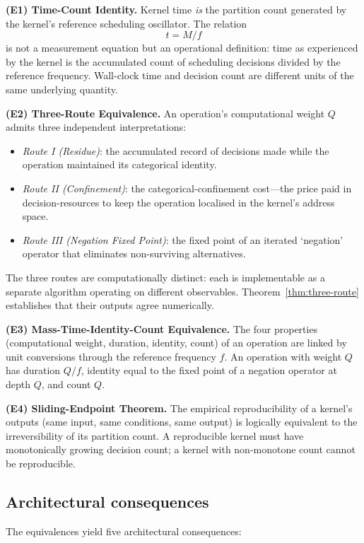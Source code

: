 \documentclass[twocolumn,11pt,a4paper]{article}
\newcommand{\Mcount}{M}
\newcommand{\Qweight}{Q}
\begin{document}
\textbf{(E1) Time-Count Identity.} Kernel time \emph{is} the partition count generated by the kernel's reference scheduling oscillator. The relation
\[
t = \Mcount / f
\]
is not a measurement equation but an operational definition: time as experienced by the kernel is the accumulated count of scheduling decisions divided by the reference frequency. Wall-clock time and decision count are different units of the same underlying quantity.

\textbf{(E2) Three-Route Equivalence.} An operation's computational weight $\Qweight$ admits three independent interpretations:
\begin{itemize}[nosep]
\item \emph{Route I (Residue)}: the accumulated record of decisions made while the operation maintained its categorical identity.
\item \emph{Route II (Confinement)}: the categorical-confinement cost---the price paid in decision-resources to keep the operation localised in the kernel's address space.
\item \emph{Route III (Negation Fixed Point)}: the fixed point of an iterated `negation' operator that eliminates non-surviving alternatives.
\end{itemize}
The three routes are computationally distinct: each is implementable as a separate algorithm operating on different observables. Theorem~\ref{thm:three-route} establishes that their outputs agree numerically.

\textbf{(E3) Mass-Time-Identity-Count Equivalence.} The four properties (computational weight, duration, identity, count) of an operation are linked by unit conversions through the reference frequency $f$. An operation with weight $\Qweight$ has duration $\Qweight/f$, identity equal to the fixed point of a negation operator at depth $\Qweight$, and count $\Qweight$.

\textbf{(E4) Sliding-Endpoint Theorem.} The empirical reproducibility of a kernel's outputs (same input, same conditions, same output) is logically equivalent to the irreversibility of its partition count. A reproducible kernel must have monotonically growing decision count; a kernel with non-monotone count cannot be reproducible.

\subsection{Architectural consequences}

The equivalences yield five architectural consequences:
\end{document}
